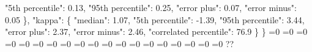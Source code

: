 {{        "5th percentile": 0.13, %
        "95th percentile": 0.25, %
        "error plus": 0.07, %
        "error minus": 0.05%
      \}, %
      "kappa": \{%
        "median": 1.07, %
        "5th percentile": {-}1.39, %
        "95th percentile": 3.44, %
        "error plus": 2.37, %
        "error minus": 2.46, %
        "correlated percentile": 76.9%
      \}%
    \}}%
  \else%
    \ifnum{}=0%
      \let\mzCopulaCorrelationModel@I@out\mzCopulaCorrelationModel@III%
    \else%
      \ifnum{}=0%
      \let\mzCopulaCorrelationModel@I@out\mzCopulaCorrelationModel@IV%
    \else%
      \ifnum{}=0%
      \let\mzCopulaCorrelationModel@I@out\mzCopulaCorrelationModel@V%
    \else%
      \ifnum{}=0%
      \let\mzCopulaCorrelationModel@I@out\mzCopulaCorrelationModel@VI%
    \else%
      \ifnum{}=0%
      \let\mzCopulaCorrelationModel@I@out\mzCopulaCorrelationModel@VII%
    \else%
      \ifnum{}=0%
      \let\mzCopulaCorrelationModel@I@out\mzCopulaCorrelationModel@VIII%
    \else%
      \ifnum{}=0%
      \let\mzCopulaCorrelationModel@I@out\mzCopulaCorrelationModel@IX%
    \else%
      \ifnum{}=0%
      \let\mzCopulaCorrelationModel@I@out\mzCopulaCorrelationModel@X%
    \else%
      \ifnum{}=0%
      \let\mzCopulaCorrelationModel@I@out\mzCopulaCorrelationModel@XI%
    \else%
      \ifnum{}=0%
      \let\mzCopulaCorrelationModel@I@out\mzCopulaCorrelationModel@XII%
    \else%
      \ifnum{}=0%
      \let\mzCopulaCorrelationModel@I@out\mzCopulaCorrelationModel@XIII%
    \else%
      \ifnum{}=0%
      \let\mzCopulaCorrelationModel@I@out\mzCopulaCorrelationModel@XIV%
    \else%
      \ifnum{}=0%
      \let\mzCopulaCorrelationModel@I@out\mzCopulaCorrelationModel@XV%
    \else%
      \ifnum{}=0%
      \let\mzCopulaCorrelationModel@I@out\mzCopulaCorrelationModel@XVI%
    \else%
      \ifnum{}=0%
      \let\mzCopulaCorrelationModel@I@out\mzCopulaCorrelationModel@XVII%
    \else%
      \ifnum{}=0%
      \let\mzCopulaCorrelationModel@I@out\mzCopulaCorrelationModel@XVIII%
    \else%
      \ifnum{}=0%
      \let\mzCopulaCorrelationModel@I@out\mzCopulaCorrelationModel@XIX%
    \else%
      \ifnum{}=0%
      \let\mzCopulaCorrelationModel@I@out\mzCopulaCorrelationModel@XX%
    \else%
      \ifnum{}=0%
      \let\mzCopulaCorrelationModel@I@out\mzCopulaCorrelationModel@XXI%
    \else%
      \def\mzCopulaCorrelationModel@I@out{%
    ??}%
    \fi\fi\fi\fi\fi\fi\fi\fi\fi\fi\fi\fi\fi\fi\fi\fi\fi\fi\fi
  \fi
  \mzCopulaCorrelationModel@I@out
}\newcommand\mzCopulaCorrelationModel@II[1][all]{%
  \ifnum\pdfstrcmp{#1}{all}=0%
    \def\mzCopulaCorrelationModel@II@out{%
    \{\}}%
  \else%
    \def\mzCopulaCorrelationModel@II@out{%
    ??}%
    
}
